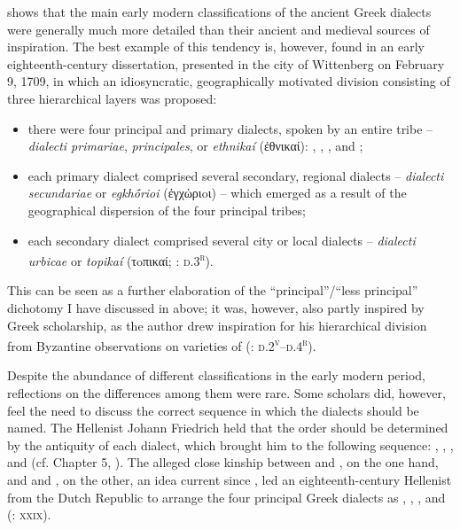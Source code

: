  shows that the main early modern classifications of the ancient Greek dialects were generally much more detailed than their ancient and medieval sources of inspiration. The best example of this tendency is, however, found in an early eighteenth-century dissertation, presented in the city of Wittenberg on February 9, 1709, in which an idiosyncratic, geographically motivated division consisting of three hierarchical layers was proposed:

\begin{itemize}
\item there were four principal and primary dialects, spoken by an entire tribe – \textit{dialecti primariae}, \textit{principales}, or \textit{ethnikaí} (ἐθνικαί): , , , and ;

\item each primary dialect comprised several secondary, regional dialects – \textit{dialecti secundariae} or \textit{egkhṓrioi} (ἐγχώριoι) – which emerged as a result of the geographical dispersion of the four principal tribes;

\item each secondary dialect comprised several city or local dialects – \textit{dialecti urbicae} or \textit{topikaí} (τoπικαί; \citealt{Thryllitsch1709}: \textsc{d.3}\textsc{\textsuperscript{r}}).

\end{itemize}

This can be seen as a further elaboration of the “principal”/“less principal” dichotomy I have discussed in  above; it was, however, also partly inspired by Greek scholarship, as the author drew inspiration for his hierarchical division from Byzantine observations on varieties of  (\citealt{Thryllitsch1709}: \textsc{d.2}\textsc{\textsuperscript{v}}\textsc{–d.4}\textsc{\textsuperscript{r}}).

Despite the abundance of different classifications in the early modern period, reflections on the differences among them were rare. Some scholars did, however, feel the need to discuss the correct sequence in which the dialects should be named. The  Hellenist Johann Friedrich \citet[\textsc{iv}]{Facius1782} held that the order should be determined by the antiquity of each dialect, which brought him to the following sequence: , , , and  (cf. Chapter 5, ). The alleged close kinship between  and , on the one hand, and  and , on the other, an idea current since , led an eighteenth-century Hellenist from the Dutch Republic to arrange the four principal Greek dialects as , , , and  (\citealt{Koen1766}: \textsc{xxix}).

